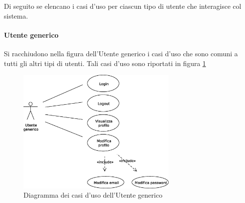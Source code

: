 Di seguito se elencano i casi d'uso per ciascun tipo di utente che interagisce col sistema. 

\paragraph{Utente generico}
Si racchiudono nella figura dell'Utente generico i casi d'uso che sono comuni a tutti gli altri tipi di utenti. Tali casi d'uso sono riportati in figura \ref{use_case_diag_generic}

\begin{figure}[h]
  \caption{Diagramma dei casi d'uso dell'Utente generico}
  \label{use_case_diag_generic}
  \centering
    \includegraphics[width=0.7\textwidth]{images/casi_uso_utente_generico.eps}
\end{figure}

